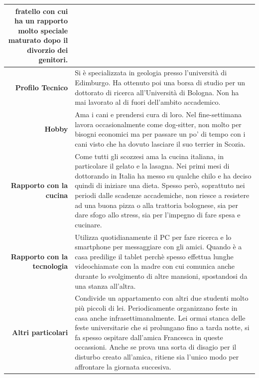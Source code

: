 \begin{table}[H]
\begin{centering}
\begin{tabular} { | r  p{12cm} | }
{fratello con cui ha un rapporto molto speciale maturato dopo il
divorzio dei genitori.} \\
\hline
		\textbf{Profilo Tecnico} & Si è specializzata in geologia presso
l'università di Edimburgo. Ha ottenuto poi una borsa di studio per un
dottorato di ricerca all'Università di Bologna. Non ha mai lavorato al
di fuori dell'ambito accademico.\\ \hline
		\textbf{Hobby} & Ama i cani e prendersi cura di loro. Nel
fine-settimana lavora occasionalmente come dog-sitter, non molto per
bisogni economici ma per passare un po' di tempo con i cani visto che ha
dovuto lasciare il suo terrier in Scozia. \\\hline
		\textbf{Rapporto con la cucina} & Come tutti gli scozzesi ama
la cucina italiana, in particolare il gelato e la lasagna. Nei
primi mesi di dottorando in Italia ha messo su qualche chilo e ha deciso
quindi di iniziare una dieta. Spesso però, soprattuto nei periodi dalle
scadenze accademiche, non riesce a resistere ad una buona pizza o alla
trattoria bolognese,
sia per dare sfogo allo stress, sia per l'impegno di fare spesa e
cucinare.\\ \hline
		\textbf{Rapporto con la tecnologia} & Utilizza quotidianamente
il PC per fare ricerca e lo smartphone per messaggiare con gli amici.
Quando è a casa predilige il tablet perchè spesso effettua lunghe
videochiamate con la madre con cui comunica anche durante lo svolgimento
di altre mansioni, spostandosi da una stanza all'altra.\\ \hline
		\textbf{Altri particolari} & Condivide un appartamento con altri
due studenti molto più piccoli di lei. Periodicamente organizzano feste
in casa anche infrasettimanalmente. Lei ormai stanca delle feste
universitarie che si prolungano fino a tarda notte, si fa spesso ospitare
dall'amica Francesca in queste occassioni. Anche se prova una sorta di disagio per il
disturbo creato all'amica, ritiene sia l'unico modo per affrontare la giornata
succesiva.\\ \hline
	\end{tabular}
	\end{centering}
\end{table}


